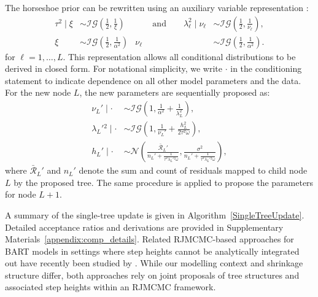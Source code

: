 The horseshoe prior can be rewritten using an auxiliary variable representation \citep{HSGibbs}:
\begin{equation}\label{AuxilliaryHorseshoe}
\begin{alignedat}{2}
\tau^2 \mid \xi         &\sim \mathcal{IG}\left(\frac{1}{2}, \frac{1}{\xi}\right) &\quad \quad\text{and}\quad\quad  \lambda_\ell^2 \mid \nu_\ell &\sim \mathcal{IG}\left(\frac{1}{2}, \frac{1}{\nu_\ell}\right),\\
\xi   &\sim \mathcal{IG}\left(\frac{1}{2}, \frac{1}{\alpha^2}\right) &  \nu_\ell &\sim \mathcal{IG}\left(\frac{1}{2}, \frac{1}{\alpha^2}\right).
\end{alignedat}
\end{equation}
for $\ell = 1, \ldots, L$.
This representation allows all conditional distributions to be derived in closed form.
For notational simplicity, we write $\cdot$ in the conditioning statement to indicate dependence on all other model parameters and the data.
For the new node $L$, the new parameters are sequentially proposed as:
\begin{equation}
\begin{split}
\nu_L' \mid \cdot &\sim \mathcal{IG}\left(1, \frac{1}{\alpha^2} + \frac{1}{\lambda_L^2}\right),\\
\lambda_L'{}^2 \mid \cdot &\sim \mathcal{IG}\left(1, \frac{1}{\nu_L'} + \frac{h_L^2}{2\tau^2\omega}\right),\\
h_L' \mid \cdot &\sim \mathcal{N}\left( \frac{\bar{\mathcal{R}}_L'}{n_L' + \frac{1}{\tau^2\lambda_L'{}^2\omega}}, \frac{\sigma^2}{n_L' + \frac{1}{\tau^2\lambda_L'{}^2\omega}}\right),
\end{split}
\end{equation}
where $\bar{\mathcal{R}}_L'$ and $n_L'$ denote the sum and count of residuals mapped to child node $L$ by the proposed tree.  
The same procedure is applied to propose the parameters for node $L+1$.

A summary of the single-tree update is given in Algorithm~\ref{SingleTreeUpdate}.
Detailed acceptance ratios and derivations are provided in Supplementary Materials~\ref{appendix:comp_details}.
Related RJMCMC-based approaches for BART models in settings where step heights cannot be analytically integrated out have recently been studied by \citet{GeneralizedBART}.
While our modelling context and shrinkage structure differ, both approaches rely on joint proposals of tree structures and associated step heights within an RJMCMC framework.






